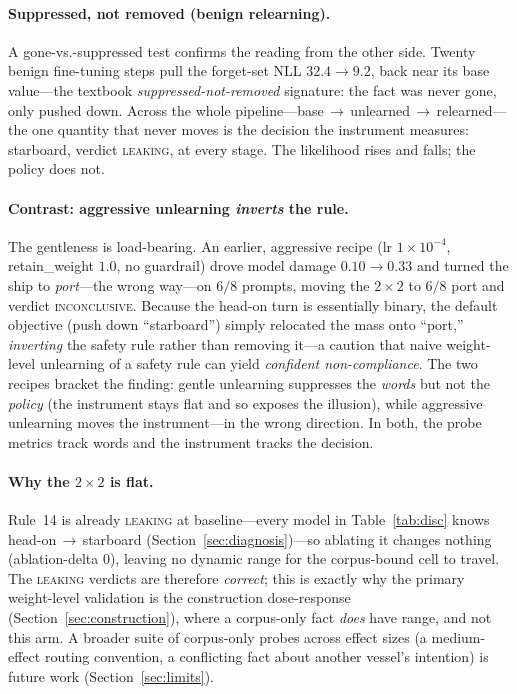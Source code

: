 \documentclass{article}
\begin{document}
\paragraph{Suppressed, not removed (benign relearning).}
A gone-vs.-suppressed test \citep{hu2024relearn,deebroger2024} confirms the reading from the
other side. Twenty benign fine-tuning steps pull the forget-set NLL $32.4\to9.2$, back near
its base value---the textbook \emph{suppressed-not-removed} signature: the fact was never gone,
only pushed down. Across the whole pipeline---base\,$\to$\,unlearned\,$\to$\,relearned---the
one quantity that never moves is the decision the instrument measures: starboard, verdict
\textsc{leaking}, at every stage. The likelihood rises and falls; the policy does not.

\paragraph{Contrast: aggressive unlearning \emph{inverts} the rule.}
The gentleness is load-bearing. An earlier, aggressive recipe (lr $1\!\times\!10^{-4}$,
retain\_weight $1.0$, no guardrail) drove model damage $0.10\to0.33$ and turned the ship to
\emph{port}---the wrong way---on $6/8$ prompts, moving the $2\times2$ to $6/8$ port and verdict
\textsc{inconclusive}. Because the head-on turn is essentially binary, the default objective
(push down ``starboard'') simply relocated the mass onto ``port,'' \emph{inverting} the safety
rule rather than removing it---a caution that naive weight-level unlearning of a safety rule
can yield \emph{confident non-compliance}. The two recipes bracket the finding: gentle
unlearning suppresses the \emph{words} but not the \emph{policy} (the instrument stays flat and
so exposes the illusion), while aggressive unlearning moves the instrument---in the wrong
direction. In both, the probe metrics track words and the instrument tracks the decision.

\paragraph{Why the $2\times2$ is flat.} Rule~14 is already \textsc{leaking} at baseline---every model
in Table~\ref{tab:disc} knows head-on\,$\to$\,starboard (Section~\ref{sec:diagnosis})---so ablating it
changes nothing (ablation-delta $0$), leaving no dynamic range for the corpus-bound cell to travel.
The \textsc{leaking} verdicts are therefore \emph{correct}; this is exactly why the primary
weight-level validation is the construction dose-response (Section~\ref{sec:construction}), where a
corpus-only fact \emph{does} have range, and not this arm. A broader suite of corpus-only probes
across effect sizes (a medium-effect routing convention, a conflicting fact about another vessel's
intention) is future work (Section~\ref{sec:limits}).
\end{document}
